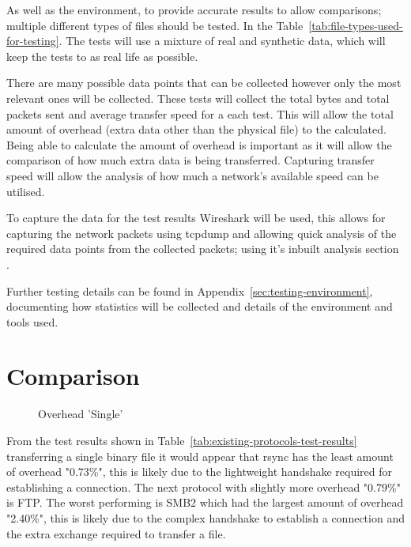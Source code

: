 As well as the environment, to provide accurate results to allow comparisons; multiple different types of files should be tested. In the Table~\ref{tab:file-types-used-for-testing}. The tests will use a mixture of real and synthetic data, which will keep the tests to as real life as possible.

There are many possible data points that can be collected however only the most relevant ones will be collected. These tests will collect the total bytes and total packets sent and average transfer speed for a each test. This will allow the total amount of overhead (extra data other than the physical file) to the calculated. Being able to calculate the amount of overhead is important as it will allow the comparison of how much extra data is being transferred. Capturing transfer speed will allow the analysis of how much a network's available speed can be utilised.

To capture the data for the test results Wireshark will be used, this allows for capturing the network packets using tcpdump and allowing quick analysis of the required data points from the collected packets; using it's inbuilt analysis section \parencite{wireshark}.

Further testing details can be found in Appendix~\ref{sec:testing-environment}, documenting how statistics will be collected and details of the environment and tools used.


\section{Comparison}
\begin{wrapfigure}{r}{0.3\textwidth}
    \caption{Overhead 'Single'}
\end{wrapfigure}

From the test results shown in Table~\ref{tab:existing-protocols-test-results} transferring a single binary file it would appear that rsync has the least amount of overhead "0.73\%", this is likely due to the lightweight handshake required for establishing a connection. The next protocol with slightly more overhead "0.79\%" is FTP. The worst performing is SMB2 which had the largest amount of overhead "2.40\%", this is likely due to the complex handshake to establish a connection and the extra exchange required to transfer a file.

